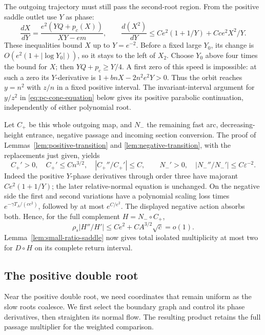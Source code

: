 The outgoing trajectory must still pass the second-root region. From
the positive saddle outlet use $Y$ as phase:
\[
 \frac{dX}{dY}=\frac{e^2(YQ+p_c(X))}{XY-em},\qquad
 \frac{d(X^2)}{dY}\le Ce^2(1+1/Y)+Cce^2X^2/Y.
\]
These inequalities bound $X$ up to $Y=e^{-2}$. Before a fixed large
$Y_0$, its change is $O(e^2(1+|\log Y_0|))$, so it stays to the
left of $X_2$. Choose $Y_0$ above four times the bound for $X$;
then $YQ+p_c\ge Y/4$. A first zero of this speed is impossible:
at such a zero its $Y$-derivative is $1+bnX-2n^2e^2Y>0$.
Thus the orbit reaches $y=n^2$ with $z/n$ in a fixed positive
interval. The invariant-interval argument for $y/z^2$ in
\eqref{eq:pc-cone-equation} below gives its positive parabolic
continuation, independently of either polynomial root.

Let $C_+$ be this whole outgoing map, and $N_-$ the remaining fast
arc, decreasing-height entrance, negative passage and incoming section
conversion. The proof of Lemmas~\ref{lem:positive-transition} and
\ref{lem:negative-transition}, with the replacements just given,
yields
\[
 C_+'>0,\quad C_+'\le Cn^{3/2},\quad |C_+''/C_+'|\le C,\qquad
 N_-'>0,\quad |N_-''/N_-'|\le C\varepsilon^{-2}.
\]
Indeed the positive $Y$-phase derivatives through order three have
majorant $Ce^2(1+1/Y)$; the later relative-normal equation is unchanged.
On the negative side the first and second variations have a polynomial
scaling loss times $e^{-\gamma T_A/(ce^2)}$, followed by at most
$e^{C/e^2}$. The displayed negative action absorbs both. Hence, for
the full complement $H=N_-\circ C_+$,
\[
 \rho_s|H''/H'|\le Ce^2+CA^{3/2}\sqrt c=o(1).
\]
Lemma~\ref{lem:small-ratio-saddle} now gives total isolated
multiplicity at most two for $D\circ H$ on its complete return interval.

\subsection{The positive double root}

Near the positive double root, we need coordinates that remain uniform
as the slow roots coalesce. We first select the boundary graph and
control its phase derivatives, then straighten its normal flow. The
resulting product retains the full passage multiplier for the weighted
comparison.

